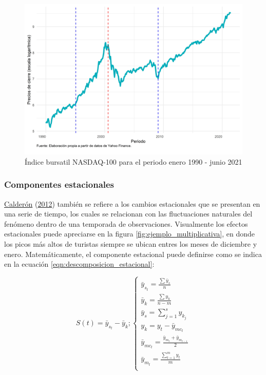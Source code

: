 \documentclass[
]{article}
\begin{document}
\begin{figure}[!h]
\includegraphics[width=1\linewidth,height=1\textheight]{Tesis_files/figure-latex/ejemplo_ciclo-1} \caption{Índice bursatil NASDAQ-100 para el periodo enero 1990 - junio 2021}\label{fig:ejemplo_ciclo}
\end{figure}

\subsubsection{Componentes estacionales}

\protect\hyperlink{ref-calderon2012estadistica}{Calderón}
(\protect\hyperlink{ref-calderon2012estadistica}{2012}) también se
refiere a los cambios estacionales que se presentan en una serie de
tiempo, los cuales se relacionan con las fluctuaciones naturales del
fenómeno dentro de una temporada de observaciones. Visualmente los
efectos estacionales puede apreciarse en la figura
\ref{fig:ejemplo_multiplicativa}, en donde los picos más altos de
turistas siempre se ubican entres los meses de diciembre y enero.
Matemáticamente, el componente estacional puede definirse como se indica
en la ecuación \ref{eqn:descomposicion_estacional}:

\begin{equation}
\label{eqn:descomposicion_estacional}
S(t)=\bar{y}_{s_t}-\bar{y}_{k};
\begin{cases}
\bar{y}_{s_t} = \frac{\sum \bar{y}_s}{n} \\
\bar{y}_k = \frac{\sum y_k}{n-m} \\
\bar{y}_s = \sum_{j=1}^s y_{k_j} \\
y_k = y_t - \bar{y}_{mc_t} \\
\bar{y}_{mc_t} = \frac{\bar{y}_{m_t} + \bar{y}_{m_{t-1}}}{2} \\
\bar{y}_{m_t} = \frac{\sum_{t=1}^m y_t}{m} \\
\end{cases}
\end{equation}
\end{document}
